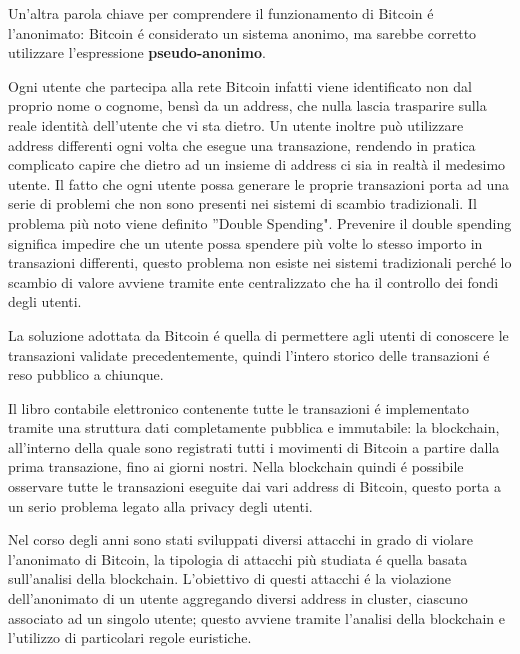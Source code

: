 Un’altra parola chiave per comprendere il funzionamento di Bitcoin é l’anonimato: Bitcoin é considerato un sistema anonimo, ma sarebbe corretto utilizzare l’espressione \textbf{pseudo-anonimo}.

Ogni utente che partecipa alla rete Bitcoin infatti viene identificato non dal proprio nome o cognome, bensì da un address, che nulla lascia trasparire sulla reale identità dell'utente che vi sta dietro. Un utente inoltre può utilizzare address differenti ogni volta che esegue
una transazione, rendendo in pratica complicato capire che dietro ad un insieme di address ci sia in realtà il medesimo utente. Il fatto che ogni utente possa generare le proprie transazioni porta ad una serie di problemi che non sono presenti nei sistemi di scambio tradizionali. Il problema più noto viene definito ''Double Spending". Prevenire il double spending significa impedire che un utente possa spendere più volte lo stesso importo in transazioni differenti, questo problema non esiste nei sistemi tradizionali perché lo scambio di valore avviene tramite ente centralizzato che ha il controllo dei fondi degli utenti. 

La soluzione adottata da Bitcoin é quella di permettere agli utenti di conoscere le transazioni validate precedentemente, quindi l'intero storico delle transazioni é reso pubblico a chiunque.

Il libro contabile elettronico contenente tutte le transazioni é implementato tramite una struttura dati completamente pubblica e immutabile: la blockchain, all’interno della quale sono registrati tutti i movimenti di Bitcoin a partire dalla prima transazione, fino ai giorni nostri. Nella blockchain quindi é possibile osservare tutte le transazioni eseguite dai vari address di Bitcoin, questo porta a un serio problema legato alla privacy degli utenti. 

Nel corso degli anni sono stati sviluppati diversi attacchi in grado di violare l'anonimato di Bitcoin, la tipologia di attacchi più studiata é quella basata sull'analisi della blockchain. L'obiettivo di questi attacchi é la violazione dell'anonimato di un utente aggregando diversi address in cluster, ciascuno associato ad un singolo utente; questo avviene tramite l'analisi della blockchain e l'utilizzo di particolari regole euristiche.

